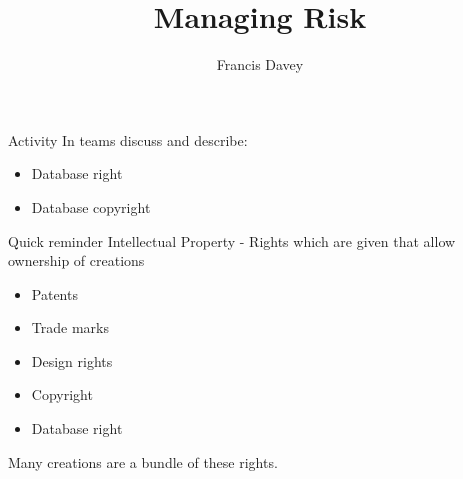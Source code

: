 \documentclass{beamer}
\begin{document}
\title{Managing Risk}
\author{Francis Davey}
\begin{frame}
  \titlepage
\end{frame}
\begin{frame}{Activity}
In teams discuss and describe:
  \begin{itemize}
  \item Database right
  \item Database copyright
  \end{itemize}
\end{frame}
\begin{frame}{Quick reminder}
Intellectual Property - Rights which are given that allow ownership of creations
\begin{itemize}
\item Patents
\item Trade marks
\item Design rights
\item Copyright
\item Database right
\end{itemize}
Many creations are a bundle of these rights.
\end{frame}
\end{document}
